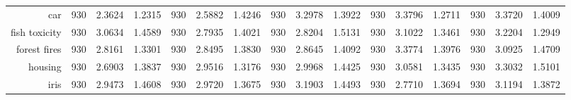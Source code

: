 \begin{table}[H]
{\begin{tabular}{rccccccccccccccc}
			car                                 & 930                                  & \cellcolor[rgb]{ .776,  .937,  .808}\textcolor[rgb]{ 0,  .38,  0}{2.3624}          & 1.2315          & 930            & 2.5882                                                                    & 1.4246          & 930            & 3.2978                                                                    & 1.3922          & 930            & 3.3796                                                                    & 1.2711          & 930            & 3.3720          & 1.4009          \\
			fish toxicity                       & 930                                  & 3.0634                                                                             & 1.4589          & 930            & \cellcolor[rgb]{ .776,  .937,  .808}\textcolor[rgb]{ 0,  .38,  0}{2.7935} & 1.4021          & 930            & 2.8204                                                                    & 1.5131          & 930            & 3.1022                                                                    & 1.3461          & 930            & 3.2204          & 1.2949          \\
			forest fires                        & 930                                  & \cellcolor[rgb]{ .776,  .937,  .808}\textcolor[rgb]{ 0,  .38,  0}{2.8161}          & 1.3301          & 930            & 2.8495                                                                    & 1.3830          & 930            & 2.8645                                                                    & 1.4092          & 930            & 3.3774                                                                    & 1.3976          & 930            & 3.0925          & 1.4709          \\
			housing                             & 930                                  & \cellcolor[rgb]{ .776,  .937,  .808}\textcolor[rgb]{ 0,  .38,  0}{2.6903}          & 1.3837          & 930            & 2.9516                                                                    & 1.3176          & 930            & 2.9968                                                                    & 1.4425          & 930            & 3.0581                                                                    & 1.3435          & 930            & 3.3032          & 1.5101          \\
			iris                                & 930                                  & 2.9473                                                                             & 1.4608          & 930            & 2.9720                                                                    & 1.3675          & 930            & 3.1903                                                                    & 1.4493          & 930            & \cellcolor[rgb]{ .776,  .937,  .808}\textcolor[rgb]{ 0,  .38,  0}{2.7710} & 1.3694          & 930            & 3.1194          & 1.3872          \\

\end{tabular}}
\end{table}

